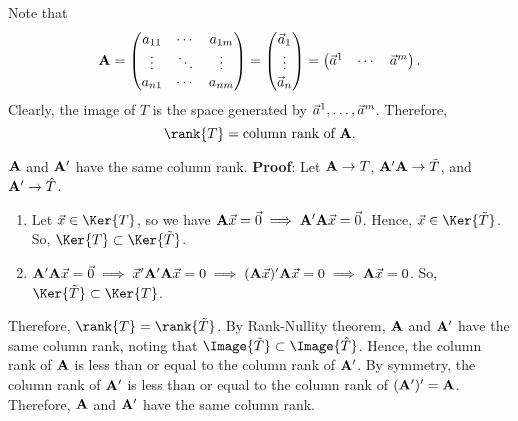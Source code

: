 \begin{Remark}{}{}
    Note that
    \[ \mathbf{A}=\begin{pmatrix}
            a_{11} & \cdots & a_{1m} \\
            \vdots & \ddots & \vdots \\
            a_{n1} & \cdots & a_{nm}
        \end{pmatrix}
        =\begin{pmatrix}
            \vec{a}_1 \\
            \vdots       \\
            \vec{a}_n
        \end{pmatrix}=\begin{pmatrix}
            \vec{a}^1 & \cdots & \vec{a}^m
        \end{pmatrix}. \]
    Clearly, the image of $ T $ is the space generated by $ \vec{a}^1,\ldots,\vec{a}^m $. Therefore,
    \[ \rank{T}=\text{column rank of }\Matrix{A}. \]
\end{Remark}
\begin{Theorem}{}{}
    $ \mathbf{A} $ and $ \mathbf{A}' $ have the same column rank.
    \tcblower{}
    \textbf{Proof}:
    Let $ \mathbf{A}\to T $, $ \mathbf{A}'\mathbf{A}\to \tilde{T} $, and $ \mathbf{A}'\to \hat{T} $.
    \begin{enumerate}[(1)]
        \item Let $ \Vector{x}\in \Ker{T} $, so we have
              $ \mathbf{A}\vec{x}=\vec{0}\implies \mathbf{A}'\mathbf{A}\vec{x}=\vec{0} $.
              Hence, $ \Vector{x}\in\Ker{\tilde{T}} $. So, $ \Ker{T}\subset \Ker{\tilde{T}} $.
        \item $ \mathbf{A}'\mathbf{A}\vec{x}=\vec{0}\implies \vec{x}'\mathbf{A}'\mathbf{A}\vec{x}=0\implies (\mathbf{A}\vec{x})'\mathbf{A}\vec{x}=0\implies \mathbf{A}\vec{x}=0 $.
              So, $ \Ker{\tilde{T}}\subset \Ker{T} $.
    \end{enumerate}
    Therefore, $ \rank{T}=\rank{\tilde{T}} $. By Rank-Nullity theorem, $ \mathbf{A} $ and $ \mathbf{A}' $ have the same column rank,
    noting that $ \Image{\tilde{T}}\subset \Image{\hat{T}} $. Hence, the column rank of $ \mathbf{A} $ is less than or equal to
    the column rank of $ \mathbf{A}' $. By symmetry, the column rank of $ \mathbf{A}' $ is less than or equal to the column rank of $ (\mathbf{A}')'=\mathbf{A} $.
    Therefore, $ \mathbf{A} $ and $ \mathbf{A}' $ have the same column rank.
\end{Theorem}

